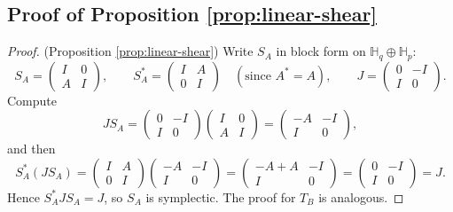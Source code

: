 \documentclass{article}
\theoremstyle{plain}
\theoremstyle{definition}
\theoremstyle{remark}
\newcommand{\bbH}{\mathbb{H}}
\begin{document}
\subsection{Proof of Proposition \ref{prop:linear-shear}}
\begin{proof}(Proposition \ref{prop:linear-shear})
Write $S_A$ in block form on $\bbH_q\oplus\bbH_p$:
\[
S_A = \begin{pmatrix} I & 0 \\ A & I \end{pmatrix},
\qquad
S_A^*=\begin{pmatrix} I & A \\ 0 & I \end{pmatrix}
\quad(\text{since }A^*=A),
\qquad
J=\begin{pmatrix} 0 & -I \\ I & 0 \end{pmatrix}.
\]
Compute
\[
JS_A=\begin{pmatrix} 0 & -I \\ I & 0 \end{pmatrix}\begin{pmatrix} I & 0 \\ A & I \end{pmatrix}
= \begin{pmatrix} -A & -I \\ I & 0 \end{pmatrix},
\]
and then
\[
S_A^*(JS_A)=
\begin{pmatrix} I & A \\ 0 & I \end{pmatrix}
\begin{pmatrix} -A & -I \\ I & 0 \end{pmatrix}
=
\begin{pmatrix} -A + A & -I \\ I & 0 \end{pmatrix}
=
\begin{pmatrix} 0 & -I \\ I & 0 \end{pmatrix}
=J.
\]
Hence $S_A^*JS_A=J$, so $S_A$ is symplectic. The proof for $T_B$ is analogous.
\end{proof}
\end{document}
